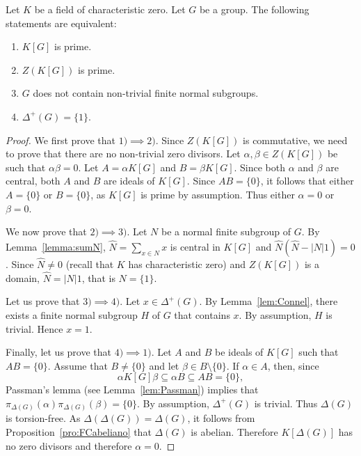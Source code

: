\begin{theorem}[Connell]
	\label{thm:Connel}
	Let $K$ be a field of characteristic zero. Let 
	$G$ be a group. The following statements are equivalent: 
	\begin{enumerate}
		\item $K[G]$ is prime.
		\item $Z(K[G])$ is prime.
		\item $G$ does not contain non-trivial finite normal subgroups. 
		\item $\Delta^+(G)=\{1\}$.
	\end{enumerate}
\end{theorem}

\begin{proof}
	We first prove that $1)\implies2)$. Since $Z(K[G])$ is commutative, we need to prove that 
	there are no non-trivial zero divisors. Let $\alpha,\beta\in Z(K[G])$ be such that 
	$\alpha\beta=0$. Let $A=\alpha K[G]$ and $B=\beta K[G]$. Since both $\alpha$ and 
	$\beta$ are central, both $A$ and $B$ are ideals of $K[G]$. Since $AB=\{0\}$,
	it follows that either $A=\{0\}$ or $B=\{0\}$, as $K[G]$ is prime by assumption. 
	Thus either $\alpha=0$ or 
	$\beta=0$.

	We now prove that $2)\implies3)$. Let $N$ be a normal finite subgroup of $G$. 
	By Lemma~\ref{lemma:sumN}, $\widehat{N}=\sum_{x\in N}x$ is central in 
	$K[G]$ and $\widehat{N}(\widehat{N}-|N|1)=0$. Since $\widehat{N}\ne 0$ (recall that 
	$K$ has characteristic zero) and $Z(K[G])$ is a domain,
	$\widehat{N}=|N|1$, that is $N=\{1\}$.

	Let us prove that $3)\implies4)$. Let $x\in\Delta^+(G)$. By Lemma~\ref{lem:Connel},
	there exists a finite normal subgroup $H$ of $G$ that contains $x$. By assumption, $H$ is trivial. 
	Hence $x=1$.

	Finally, let us prove that $4)\implies1)$. Let $A$ and $B$ be ideals of 
	$K[G]$ such that $AB=\{0\}$. Assume that $B\ne\{ 0\}$ and let $\beta\in
	B\setminus\{0\}$.  If $\alpha\in A$, then, since 
	\[
	\alpha K[G]\beta\subseteq \alpha B\subseteq AB=\{0\},
	\]
	Passman's lemma (see Lemma~\ref{lem:Passman}) 
	implies that $\pi_{\Delta(G)}(\alpha)\pi_{\Delta(G)}(\beta)=\{0\}$.
	By assumption, $\Delta^+(G)$ is trivial. 
	Thus $\Delta(G)$ is torsion-free. 
	As $\Delta(\Delta(G))=\Delta(G)$, it follows from 
	Proposition~\ref{pro:FCabeliano} that  
	$\Delta(G)$ is abelian. Therefore 
	$K[\Delta(G)]$ has no zero divisors and therefore $\alpha=0$. 
\end{proof}

